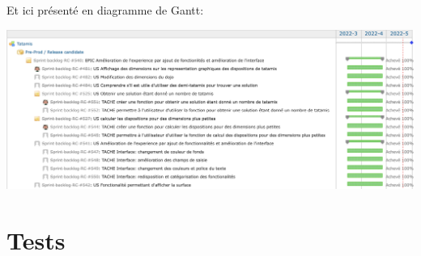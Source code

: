 Et ici présenté en diagramme de Gantt:
\begin{center}
    \includegraphics[width=16cm]{images/tatamis-gantt-rc.png}

\end{center}

\newpage
\section{Tests}



